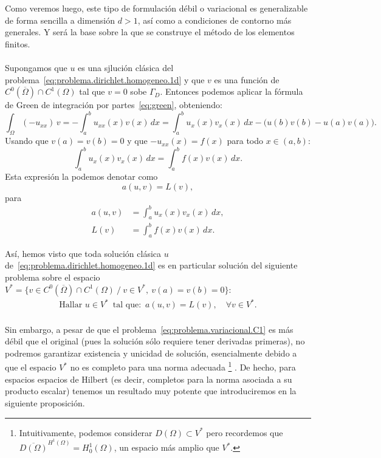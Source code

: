 \documentclass[11pt]{article}
\theoremstyle{plain}
\theoremstyle{definition}
\newcounter{stepnum}[section]
\newcommand{\step}[1][]{\bigskip\noindent\textbf{\thesection.\refstepcounter{stepnum}\thestepnum}.\enspace{#1}}
\renewcommand{\step}[1][]{\paragraph{#1}\hspace{-1.1em}}
\newcommand{\uxx}{\ensuremath{u_{xx}}\xspace}
\begin{document}
{Como veremos luego, este tipo de formulación débil o variacional es generalizable de forma sencilla a dimensión $d>1$, así como a  condiciones de contorno más generales. Y será la base sobre la que  se construye el método de los elementos finitos. 


\step
Supongamos que $u$ es una sjlución clásica del problema~\eqref{eq:problema.dirichlet.homogeneo.1d} y que $v$ es una función de $C^0(\overline\Omega)\cap C^1(\Omega)$ tal que $v=0$ sobe $\Gamma_D$. Entonces podemos aplicar la fórmula de Green de integración por partes~\eqref{eq:green}, obteniendo:
\begin{equation*}
  \int_\Omega (-\uxx)\,v  = -  \int_a^b \uxx(x) v(x) \,dx = 
  \int_a^b u_x(x) v_x(x)\,dx - \big( u(b)v(b) - u(a)v(a)  \big).
\end{equation*}
Usando que $v(a)=v(b)=0$ y que $-\uxx(x)=f(x)$ para todo $x\in(a,b)$:
\[
  \int_a^b u_x(x) v_x(x)\,dx  = \int_a^b f(x) v(x) \, dx.
\]
Esta expresión la podemos denotar como
\[
  a(u,v)=L(v),
\]
para
\begin{align}
  a(u,v)  &= \int_a^b u_x(x) v_x(x)\,dx,  
  \label{eq:forma.bilineal.a}
\\
  L(v)  &= \int_a^b f(x) v(x) \, dx.
  \label{eq:forma.lineal.L}
\end{align}


Así, hemos visto que toda solución clásica $u$ de~\eqref{eq:problema.dirichlet.homogeneo.1d} es en particular solución del siguiente problema sobre el espacio  $V^* = \{ v\in C^0(\overline\Omega)\cap C^1(\Omega) \ /\ v\in V^*,\  v(a)=v(b)=0\}$:
\begin{equation}
  \label{eq:problema.variacional.C1}
\begin{aligned}
  \text{Hallar }u\in V^*  \enspace\text{tal que:} \enspace
a(u,v) = L(v), \quad \forall v\in V^*.
\end{aligned}
\end{equation}

\step Sin embargo, a pesar de que el problema~\eqref{eq:problema.variacional.C1} es más débil que el original (pues la solución sólo requiere tener derivadas primeras), no podremos garantizar existencia y unicidad de solución, esencialmente debido a que el espacio $V^*$ no es completo para una norma adecuada%
%
\footnote{
  Intuitivamente, podemos considerar $D(\Omega)\subset V^*$ pero recordemos que $\overline {D(\Omega)}^{H^1(\Omega)} = H_0^1(\Omega)$, un espacio más amplio que $V^*$.
} 
% 
.
De hecho, para espacios espacios de Hilbert (es decir, completos para la norma asociada a su producto escalar) tenemos un resultado muy potente que introduciremos en la siguiente proposición.

}
\end{document}
